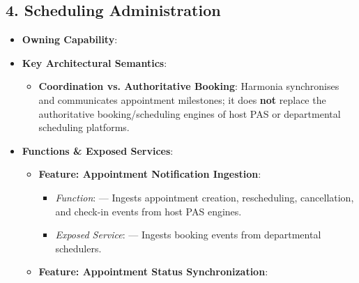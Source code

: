 \par\smallskip
{}\label{rad:sa:47}
\subsection*{4. Scheduling Administration}
\label{rad:sa:48}

\begin{itemize}

\item 
\textbf{Owning Capability}: \texttt{}



\item 
\textbf{Key Architectural Semantics}:


\begin{itemize}

\item 
\textbf{Coordination vs. Authoritative Booking}: Harmonia synchronises and communicates appointment milestones; it does \textbf{not} replace the authoritative booking/\allowbreak{}scheduling engines of host PAS or departmental scheduling platforms.



\end{itemize}


\item 
\textbf{Functions \& Exposed Services}:


\begin{itemize}

\item 
\textbf{Feature: Appointment Notification Ingestion}:


\begin{itemize}

\item 
\emph{Function}: \texttt{} — Ingests appointment creation, rescheduling, cancellation, and check-in events from host PAS engines.



\item 
\emph{Exposed Service}: \texttt{} — Ingests booking events from departmental schedulers.



\end{itemize}


\item 
\textbf{Feature: Appointment Status Synchronization}:



\end{itemize}
\end{itemize}
